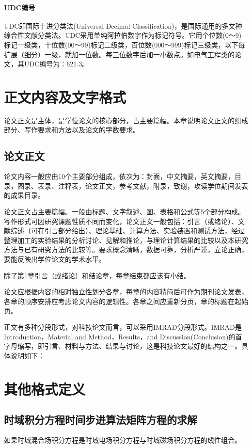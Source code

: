 \documentclass{cqupt_thesis}
\begin{document}
    \subsubsection{UDC编号}
    UDC即国际十进分类法(Universal Decimal Classification)，是国际通用的多文种综合性文献分类法。UDC采用单纯阿拉伯数字作为标记符号。它用个位数(0～9)标记一级类，十位数(00～99)标记二级类，百位数(000～999)标记三级类，以下每扩展（细分）一级，就加一位数。每三位数字后加一小数点。如电气工程类的论文，其UDC编号为：621.3。


    \chapter{正文内容及文字格式}
    论文正文是主体，是学位论文的核心部分，占主要篇幅。本章说明论文正文的组成部分、写作要求和方法以及论文的字数要求。


    \section{论文正文}
    论文内容一般应由10个主要部分组成，依次为：封面，中文摘要，英文摘要，目录，图录、表录、注释表，论文正文，参考文献，附录，致谢，攻读学位期间发表的成果目录。

    论文正文占主要篇幅。一般由标题、文字叙述、图、表格和公式等5个部分构成。写作形式可因研究课题性质不同而变化，论文正文一般包括：引言（或绪论）、文献综述（可在引言部分给出）、理论基础、计算方法、实验装置和测试方法，经过整理加工的实验结果的分析讨论、见解和推论，与理论计算结果的比较以及本研究方法与已有研究方法的比较等。要求概念清晰，数据可靠，分析严谨，立论正确，要能反映出学位论文的学术水平。

    除了第1章引言（或绪论）和结论章，每章结束都应该有小结。

    论文应根据内容的相对独立性划分各章，每章的内容精简后可作为期刊论文发表，各章的顺序安排应考虑论文内容的逻辑性。各章之间应重新分页，章的标题在起始页。

    正文有多种分段形式，对科技论文而言，可以采用IMRAD分段形式。IMRAD是Introduction，Material and Method，Results，and Discussion(Conclusion)的首字母缩写，即引言、材料与方法、结果与讨论，这是科技论文最好的结构之一。具体说明如下：


    \chapter{其他格式定义}


    \section{时域积分方程时间步进算法矩阵方程的求解}
    \begin{theorem}
        如果时域混合场积分方程是时域电场积分方程与时域磁场积分方程的线性组合。
    \end{theorem}
\end{document}
